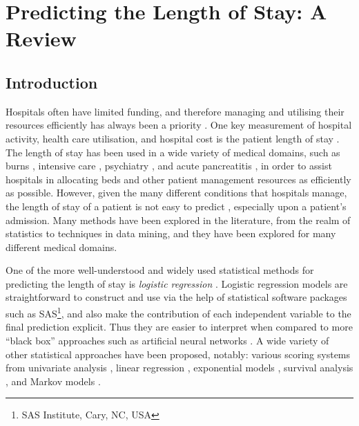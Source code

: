\chapter{Predicting the Length of Stay: A Review} \label{chap:litreview}

\section{Introduction}
Hospitals often have limited funding, and therefore managing and utilising
their resources efficiently has always been a priority \cite{Walczak2003}.
One key measurement of hospital activity, health care utilisation, and hospital
cost is the patient length of stay \citep{Ng2006,Omachonu2004}. The length of
stay has been used in a wide variety of medical domains, such as burns
 \citep{Yang2010}, intensive
care \citep{Dybowski1996,Harper2005,Perez2006,Tu1993},
psychiatry \citep{Lowell1997}, and acute pancreatitis \citep{Pofahl1998}, in
order to assist hospitals in allocating beds and other patient management
resources as efficiently as possible. However, given the many different
conditions that hospitals manage, the length of stay of a patient is
not easy to predict \citep{Walczak2003}, especially upon a patient's admission.
Many methods have been explored in the literature, from the realm of statistics
to techniques in data mining, and they have been explored for many different
medical domains.

One of the more well-understood and widely used statistical methods for
predicting the length of stay is \textit{logistic regression} \citep{Tu1996}.
Logistic regression models are straightforward to construct and use via the
help of statistical software packages such as
SAS\footnote{SAS Institute, Cary, NC, USA}, and
also make the contribution of each independent variable to the final
prediction explicit. Thus they are easier to interpret when compared to more
``black box'' approaches such as artificial neural networks \citep{Adams2012}.
A wide variety of other statistical approaches have been proposed, notably:
various scoring systems from univariate analysis \citep{Adams2012,Lavoie2005},
linear regression \citep{Yang2010}, exponential models \citep{Clark2007},
survival analysis \citep{Vasilakis2005}, and Markov
models \citep{Jain1989,Kapadia2000,Perez2006}.

